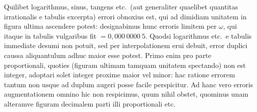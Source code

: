 \documentclass[12pt,a4paper]{book}
\begin{document}
Quilibet logarithmus, sinus, tangens etc.~(aut generaliter quaelibet quantitas irrationalis e tabulis excerpta) errori obnoxius est, qui ad dimidiam unitatem in figura ultima ascendere potest: designabimus hunc erroris limitem per $\omega$, qui itaque in tabulis vulgaribus fit $=0{,}000\ 0000\ 5$. Quodsi logarithmus etc.~e tabulis immediate desumi non potuit, sed per interpolationem erui debuit, error duplici caussa aliquantulum adhuc maior esse potest. Primo enim pro parte proportionali, quoties (figuram ultimam tamquam unitatem spectando) non est integer, adoptari solet integer proxime maior vel minor: hac ratione errorem tantum non usque ad duplum augeri posse facile perspicitur. Ad hanc vero erroris augmentationem omnino hic non respicimus, quum nihil obstet, quominus unam alteramve figuram decimalem parti illi proportionali etc.
\end{document}
